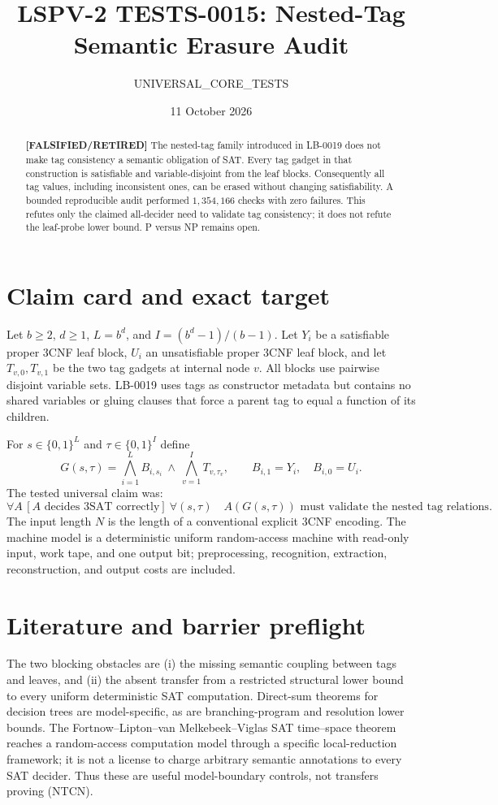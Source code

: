 \documentclass[11pt]{article}
\title{LSPV-2 TESTS-0015: Nested-Tag Semantic Erasure Audit}
\author{UNIVERSAL\_CORE\_TESTS}
\date{11 October 2026}
\newcommand{\status}[1]{\textbf{[#1]}}
\begin{document}
\maketitle

\begin{abstract}
\status{FALSIFIED/RETIRED} The nested-tag family introduced in LB-0019 does
not make tag consistency a semantic obligation of SAT.  Every tag gadget in
that construction is satisfiable and variable-disjoint from the leaf blocks.
Consequently all tag values, including inconsistent ones, can be erased
without changing satisfiability.  A bounded reproducible audit performed
$1{,}354{,}166$ checks with zero failures.  This refutes only the claimed
all-decider need to validate tag consistency; it does not refute the
leaf-probe lower bound.  P versus NP remains open.
\end{abstract}

\section{Claim card and exact target}

Let $b\ge2$, $d\ge1$, $L=b^d$, and
$I=(b^d-1)/(b-1)$.  Let $Y_i$ be a satisfiable proper 3CNF leaf block,
$U_i$ an unsatisfiable proper 3CNF leaf block, and let $T_{v,0},T_{v,1}$
be the two tag gadgets at internal node $v$.  All blocks use pairwise
disjoint variable sets.  LB-0019 uses tags as constructor metadata but
contains no shared variables or gluing clauses that force a parent tag to
equal a function of its children.

For $s\in\{0,1\}^{L}$ and $\tau\in\{0,1\}^{I}$ define
\[
 G(s,\tau)=
 \bigwedge_{i=1}^{L} B_{i,s_i}\ \wedge\
 \bigwedge_{v=1}^{I}T_{v,\tau_v},
 \qquad B_{i,1}=Y_i,\quad B_{i,0}=U_i .
\]
The tested universal claim was:
\[
\forall A\,[A\text{ decides 3SAT correctly}]
\ \forall(s,\tau)\quad
A(G(s,\tau))\text{ must validate the nested tag relations}.
\tag{NTCN}
\]
The input length $N$ is the length of a conventional explicit 3CNF
encoding.  The machine model is a deterministic uniform random-access
machine with read-only input, work tape, and one output bit; preprocessing,
recognition, extraction, reconstruction, and output costs are included.

\section{Literature and barrier preflight}

The two blocking obstacles are (i) the missing semantic coupling between
tags and leaves, and (ii) the absent transfer from a restricted structural
lower bound to every uniform deterministic SAT computation.  Direct-sum
theorems for decision trees are model-specific, as are branching-program
and resolution lower bounds.  The Fortnow--Lipton--van Melkebeek--Viglas
SAT time--space theorem reaches a random-access computation model through a
specific local-reduction framework; it is not a license to charge arbitrary
semantic annotations to every SAT decider.  Thus these are useful
model-boundary controls, not transfers proving (NTCN).
\end{document}
